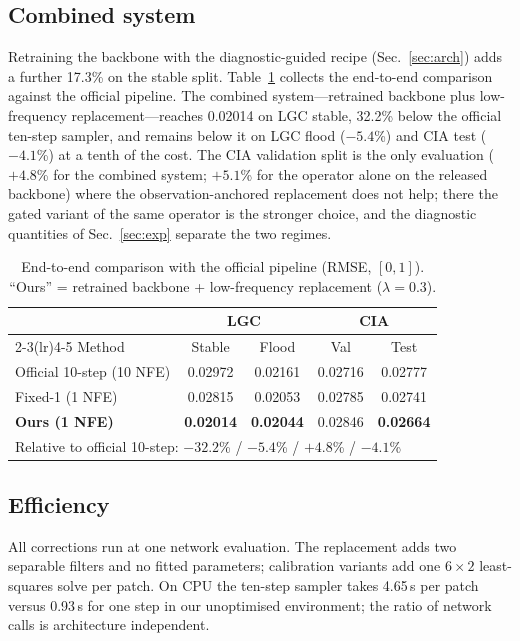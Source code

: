 \documentclass{article}
\begin{document}
\subsection{Combined system}
\label{sec:combined}
Retraining the backbone with the diagnostic-guided recipe (Sec.~\ref{sec:arch}) adds a further 17.3\% on the stable split. Table~\ref{tab:system} collects the end-to-end comparison against the official pipeline. The combined system---retrained backbone plus low-frequency replacement---reaches 0.02014 on LGC stable, 32.2\% below the official ten-step sampler, and remains below it on LGC flood ($-5.4$\%) and CIA test ($-4.1$\%) at a tenth of the cost. The CIA validation split is the only evaluation ($+4.8$\% for the combined system; $+5.1$\% for the operator alone on the released backbone) where the observation-anchored replacement does not help; there the gated variant of the same operator is the stronger choice, and the diagnostic quantities of Sec.~\ref{sec:exp} separate the two regimes.

\begin{table}[t]
\centering
\caption{End-to-end comparison with the official pipeline (RMSE, $[0,1]$). ``Ours'' = retrained backbone + low-frequency replacement ($\lambda{=}0.3$).}
\label{tab:system}
\begin{tabular}{lcccc}
\toprule
 & \multicolumn{2}{c}{LGC} & \multicolumn{2}{c}{CIA} \\
\cmidrule(lr){2-3}\cmidrule(lr){4-5}
Method & Stable & Flood & Val & Test \\
\midrule
Official 10-step (10 NFE) & 0.02972 & 0.02161 & 0.02716 & 0.02777 \\
Fixed-1 (1 NFE) & 0.02815 & 0.02053 & 0.02785 & 0.02741 \\
\textbf{Ours (1 NFE)} & \textbf{0.02014} & \textbf{0.02044} & 0.02846 & \textbf{0.02664} \\
\midrule
\multicolumn{5}{l}{\footnotesize Relative to official 10-step: $-32.2$\% / $-5.4$\% / $+4.8$\% / $-4.1$\%} \\
\bottomrule
\end{tabular}
\end{table}

\subsection{Efficiency}
All corrections run at one network evaluation. The replacement adds two separable filters and no fitted parameters; calibration variants add one $6\times2$ least-squares solve per patch. On CPU the ten-step sampler takes 4.65\,s per patch versus 0.93\,s for one step in our unoptimised environment; the ratio of network calls is architecture independent.
\end{document}
